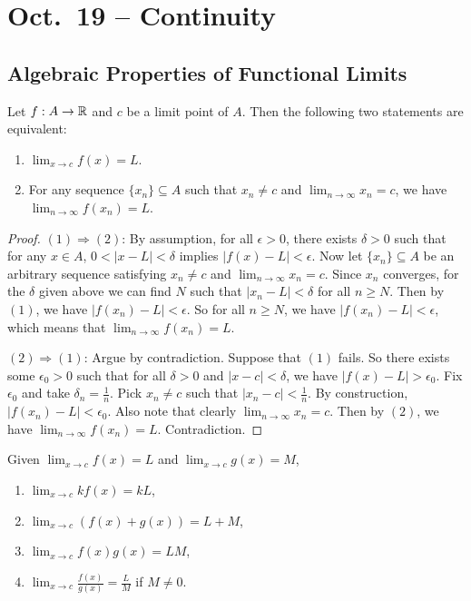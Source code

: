 \chapter{Oct.~19 -- Continuity}

\section{Algebraic Properties of Functional Limits}
\begin{theorem}
  Let $f : A \to \mathbb{R}$ and $c$ be a limit point of $A$.
  Then the following two statements are equivalent:
  \begin{enumerate}
    \item $\lim_{x \to c} f(x) = L$.
    \item For any sequence $\{x_n\} \subseteq A$ such that
      $x_n \ne c$ and
      $\lim_{n \to \infty} x_n = c$, we have
      $\lim_{n \to \infty} f(x_n) = L$.
  \end{enumerate}
\end{theorem}

\begin{proof}
  $(1) \Rightarrow (2)$: By assumption, for all $\epsilon > 0$,
  there exists $\delta > 0$ such that for any $x \in A$,
  $0 < |x - L| < \delta$ implies $|f(x) - L| < \epsilon$.
  Now let $\{x_n\} \subseteq A$ be an arbitrary sequence satisfying
  $x_n \ne c$ and $\lim_{n \to \infty} x_n = c$. Since $x_n$
  converges, for the
  $\delta$ given above we can find $N$ such that
  $|x_n - L| < \delta$ for all $n \ge N$. Then by $(1)$,
  we have $|f(x_n) - L| < \epsilon$. So for all $n \ge N$,
  we have $|f(x_n) - L| < \epsilon$, which means that
  $\lim_{n \to \infty} f(x_n) = L$.

  $(2) \Rightarrow (1)$: Argue by contradiction. Suppose that
  $(1)$ fails. So there exists some $\epsilon_0 > 0$ such that
  for all $\delta > 0$ and $|x - c| < \delta$, we have
  $|f(x) - L| > \epsilon_0$. Fix $\epsilon_0$ and take
  $\delta_n = \frac{1}{n}$. Pick $x_n \ne c$ such that
  $|x_n - c| < \frac{1}{n}$. By construction,
  $|f(x_n) - L | < \epsilon_0$. Also note that clearly
  $\lim_{n \to \infty} x_n = c$. Then by $(2)$, we have
  $\lim_{n \to \infty} f(x_n) = L$. Contradiction.
\end{proof}

\begin{corollary}
  Given $\lim_{x \to c} f(x) = L$ and $\lim_{x \to c} g(x) = M$,
  \begin{enumerate}
    \item $\lim_{x \to c} kf(x) = kL$,
    \item $\lim_{x \to c} \left(f(x) + g(x)\right) = L + M$,
    \item $\lim_{x \to c} f(x)g(x) = LM$,
    \item $\lim_{x \to c} \frac{f(x)}{g(x)} = \frac{L}{M}$ if
      $M \ne 0$.
  \end{enumerate}
\end{corollary}

